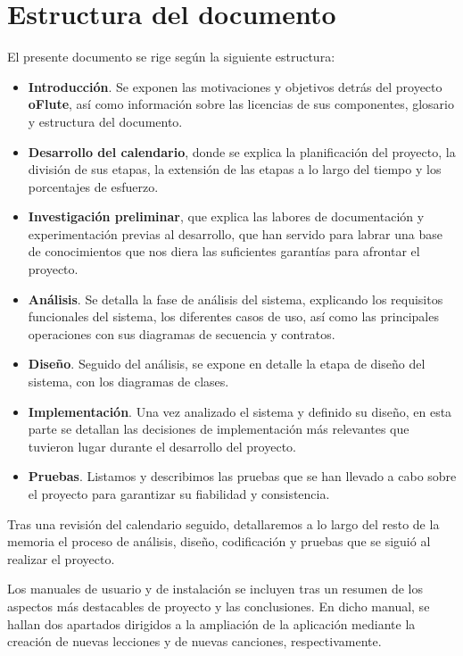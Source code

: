 \section{Estructura del documento}
El presente documento se rige según la siguiente estructura:

\begin{itemize}
\item \textbf{Introducción}. Se exponen las motivaciones y objetivos detrás del
  proyecto \textbf{oFlute}, así como información sobre las licencias de sus
  componentes, glosario y estructura del documento.
\item \textbf{Desarrollo del calendario}, donde se explica la planificación del
  proyecto, la división de sus etapas, la extensión de las etapas a lo largo del
  tiempo y los porcentajes de esfuerzo.
\item \textbf{Investigación preliminar}, que explica las labores de
  documentación y experimentación previas al desarrollo, que han servido para
  labrar una base de conocimientos que nos diera las suficientes garantías para
  afrontar el proyecto.
\item \textbf{Análisis}. Se detalla la fase de análisis del sistema, explicando
  los requisitos funcionales del sistema, los diferentes casos de uso, así como
  las principales operaciones con sus diagramas de secuencia y contratos.
\item \textbf{Diseño}. Seguido del análisis, se expone en detalle la etapa de
  diseño del sistema, con los diagramas de clases.
\item \textbf{Implementación}. Una vez analizado el sistema y definido su
  diseño, en esta parte se detallan las decisiones de implementación más
  relevantes que tuvieron lugar durante el desarrollo del proyecto.
\item \textbf{Pruebas}. Listamos y describimos las pruebas que se han llevado a
  cabo sobre el proyecto para garantizar su fiabilidad y consistencia.
\end{itemize}

Tras una revisión del calendario seguido, detallaremos a lo largo del
resto de la memoria el proceso de análisis, diseño, codificación y
pruebas que se siguió al realizar el proyecto.  

Los manuales de usuario y de instalación se incluyen tras un resumen
de los aspectos más destacables de proyecto y las conclusiones. En
dicho manual, se hallan dos apartados dirigidos a la ampliación de la
aplicación mediante la creación de nuevas lecciones y de nuevas
canciones, respectivamente.

